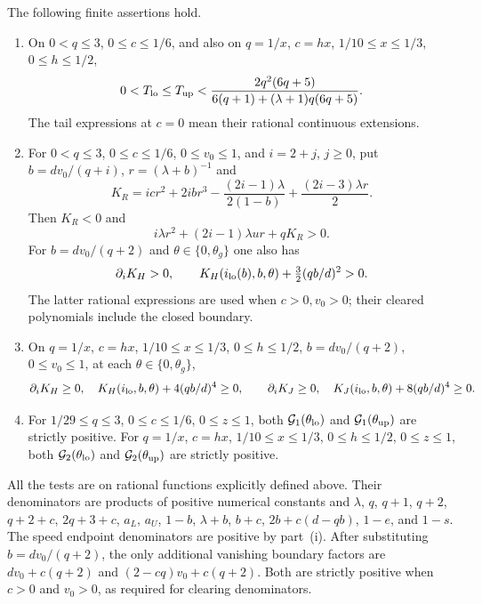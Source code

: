\begin{lemma}
\label{lem:low-Q12-arithmetic}
The following finite assertions hold.
\begin{enumerate}
\item On $0<q\le3$, $0\le c\le1/6$, and also on
$q=1/x$, $c=hx$, $1/10\le x\le1/3$, $0\le h\le1/2$,
\[
 0<T_{\rm lo}\le T_{\rm up}
 <\frac{2q^2(6q+5)}{6(q+1)+(\lambda+1)q(6q+5)}.
\]
The tail expressions at $c=0$ mean their rational continuous
extensions.
\item For $0<q\le3$, $0\le c\le1/6$, $0\le v_0\le1$, and
$i=2+j$, $j\ge0$, put $b=dv_0/(q+i)$, $r=(\lambda+b)^{-1}$ and
\[
 K_R=icr^2+2ibr^3-\frac{(2i-1)\lambda}{2(1-b)}
                         +\frac{(2i-3)\lambda r}{2}.
\]
Then $K_R<0$ and
\[
 i\lambda r^2+(2i-1)\lambda u r+qK_R>0.
\]
For $b=dv_0/(q+2)$ and $\theta\in\{0,\theta_g\}$ one also has
\[
 \partial_iK_H>0,\qquad
 K_H(i_{\rm lo}(b),b,\theta)+\tfrac32(qb/d)^2>0.
\]
The latter rational expressions are used when $c>0,v_0>0$;
their cleared polynomials include the closed boundary.
\item On $q=1/x$, $c=hx$, $1/10\le x\le1/3$,
$0\le h\le1/2$, $b=dv_0/(q+2)$, $0\le v_0\le1$,
at each $\theta\in\{0,\theta_g\}$,
\[
 \partial_iK_H\ge0,\quad K_H(i_{\rm lo},b,\theta)+4(qb/d)^4\ge0,
 \qquad
 \partial_iK_J\ge0,\quad K_J(i_{\rm lo},b,\theta)+8(qb/d)^4\ge0.
\]
\item For $1/29\le q\le3$, $0\le c\le1/6$, $0\le z\le1$,
both $\mathcal G_1(\theta_{\rm lo})$ and
$\mathcal G_1(\theta_{\rm up})$ are strictly positive.
For $q=1/x$, $c=hx$, $1/10\le x\le1/3$,
$0\le h\le1/2$, $0\le z\le1$, both
$\mathcal G_2(\theta_{\rm lo})$ and
$\mathcal G_2(\theta_{\rm up})$ are strictly positive.
\end{enumerate}
\end{lemma}

All the tests are on rational functions explicitly defined above.
Their denominators are products of positive numerical constants and
$\lambda$, $q$, $q+1$, $q+2$, $q+2+c$, $2q+3+c$, $a_L$, $a_U$,
$1-b$, $\lambda+b$, $b+c$, $2b+c(d-qb)$, $1-e$, and $1-s$.
The speed endpoint denominators are positive by part~(i).
After substituting $b=dv_0/(q+2)$, the only additional vanishing
boundary factors are $dv_0+c(q+2)$ and
$(2-cq)v_0+c(q+2)$. Both are strictly positive when
$c>0$ and $v_0>0$, as required for clearing denominators.

